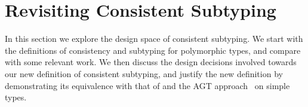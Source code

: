 \section{Revisiting Consistent Subtyping}
\label{sec:exploration}

In this section we explore the design space of consistent subtyping.
We start with the definitions of consistency and subtyping for
polymorphic types, and compare with some relevant work.
We then discuss the design decisions
involved towards our new definition of consistent subtyping, and justify the new
definition by demonstrating its equivalence with that of \citet{siek2007gradual}
and the AGT approach~\citep{garcia2016abstracting} on simple types.





